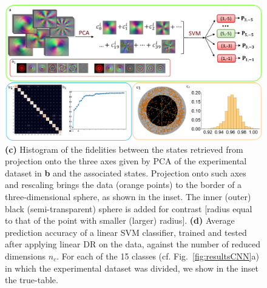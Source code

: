 \begin{figure}[t]
	\centering
	\includegraphics[width=\textwidth]{Figures/quantum-walks/VVBs-PCAResults.pdf}
	\caption{
	    \textbf{(c)} Histogram of the fidelities between the states retrieved from projection onto the three axes given by \ac{PCA} of the experimental dataset in \textbf{b} and the associated states.
	    Projection onto such axes and rescaling brings the data (orange points) to the border of a three-dimensional sphere, as shown in the inset. The inner (outer) black (semi-transparent) sphere is added for contrast [radius equal to that of the point with smaller (larger) radius].
	    \textbf{(d)} Average prediction accuracy of a linear \ac{SVM} classifier, trained and tested after applying linear DR on the data, against the number of reduced dimensions $n_c$. 
	    For each of the 15 classes (cf. Fig.~\ref{fig:resultsCNN}a) in which the experimental dataset was divided, we show in the inset the true-table. %
	}
	\label{fig:PCAresults}
\end{figure}

